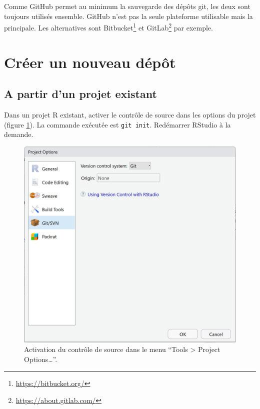 \documentclass[
  11pt,
  french,
  a4paper,
  extrafontsizes,onecolumn,openright
  ]{memoir}
\begin{document}
Comme GitHub permet au minimum la sauvegarde des dépôts git, les deux sont toujours utilisés ensemble.
GitHub n'est pas la seule plateforme utilisable mais la principale. Les alternatives sont Bitbucket\footnote{\url{https://bitbucket.org/}} et GitLab\footnote{\url{https://about.gitlab.com/}} par exemple.

\hypertarget{cruxe9er-un-nouveau-duxe9puxf4t}{%
\section{Créer un nouveau dépôt}\label{cruxe9er-un-nouveau-duxe9puxf4t}}

\hypertarget{a-partir-dun-projet-existant}{%
\subsection{A partir d'un projet existant}\label{a-partir-dun-projet-existant}}

Dans un projet R existant, activer le contrôle de source dans les options du projet (figure \ref{fig:git-Project}).
La commande exécutée est \texttt{git\ init}.
Redémarrer RStudio à la demande.



\scriptsize

\begin{figure}

{\centering \includegraphics[width=0.8\linewidth]{images/git-Project} 

}

\caption{Activation du contrôle de source dans le menu ``Tools \textgreater{} Project Options\ldots{}''.}\label{fig:git-Project}
\end{figure}
\end{document}
